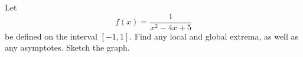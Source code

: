 Let
\begin{equation*}
  f(x) = \frac{1}{x^2-4x+5}
\end{equation*}
be defined on the interval $[-1,1]$. Find any local and global
extrema, as well as any asymptotes. Sketch the graph.
